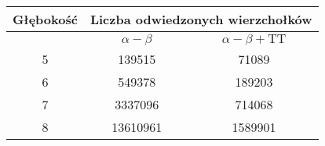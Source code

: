 \begin{tabular}{|c|c|c|}
\hline
Głębokość &\multicolumn{2}{|c|}{Liczba odwiedzonych wierzchołków}\\
\hline
& $\alpha - \beta$ &$\alpha - \beta + \text{TT}$ \\ 
\hline
5 & 139515 & 71089 \\
\hline
6 & 549378 & 189203 \\
\hline
7 & 3337096 & 714068 \\
\hline
8 & 13610961 & 1589901 \\
\hline
\end{tabular}
